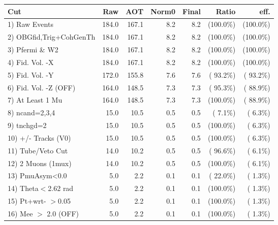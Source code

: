  \begin{table}[h!]\centering
 \begin{tabular}{||l||r|r|r|r|r|r||}
 \hline
 \hline
 Cut & Raw & AOT & Norm0 & Final & Ratio & eff.       \\
 \hline
  1) Raw Events           &        184.0 &        167.1 &          8.2 &          8.2 & (100.0\%) & (100.0\%) \\
  2) OBGfid,Trig+CohGenTh &        184.0 &        167.1 &          8.2 &          8.2 & (100.0\%) & (100.0\%) \\
  3) Pfermi \& W2         &        184.0 &        167.1 &          8.2 &          8.2 & (100.0\%) & (100.0\%) \\
  4) Fid. Vol. -X         &        184.0 &        167.1 &          8.2 &          8.2 & (100.0\%) & (100.0\%) \\
  5) Fid. Vol. -Y         &        172.0 &        155.8 &          7.6 &          7.6 & ( 93.2\%) & ( 93.2\%) \\
  6) Fid. Vol. -Z (OFF)   &        164.0 &        148.5 &          7.3 &          7.3 & ( 95.3\%) & ( 88.9\%) \\
  7) At Least 1 Mu        &        164.0 &        148.5 &          7.3 &          7.3 & (100.0\%) & ( 88.9\%) \\
  8) ncand=2,3,4          &         15.0 &         10.5 &          0.5 &          0.5 & (  7.1\%) & (  6.3\%) \\
  9) tnchgd=2             &         15.0 &         10.5 &          0.5 &          0.5 & (100.0\%) & (  6.3\%) \\
 10) +/- Tracks (V0)      &         15.0 &         10.5 &          0.5 &          0.5 & (100.0\%) & (  6.3\%) \\
 11) Tube/Veto Cut        &         14.0 &         10.2 &          0.5 &          0.5 & ( 96.6\%) & (  6.1\%) \\
 12) 2 Muons (1mux)       &         14.0 &         10.2 &          0.5 &          0.5 & (100.0\%) & (  6.1\%) \\
 13) PmuAsym<0.0          &          5.0 &          2.2 &          0.1 &          0.1 & ( 22.0\%) & (  1.3\%) \\
 14) Theta$<$2.62 rad     &          5.0 &          2.2 &          0.1 &          0.1 & (100.0\%) & (  1.3\%) \\
 15) Pt+wrt- $>$0.05      &          5.0 &          2.2 &          0.1 &          0.1 & (100.0\%) & (  1.3\%) \\
 16) Mee $>$ 2.0  (OFF)   &          5.0 &          2.2 &          0.1 &          0.1 & (100.0\%) & (  1.3\%) \\

\end{tabular}
\end{table}
